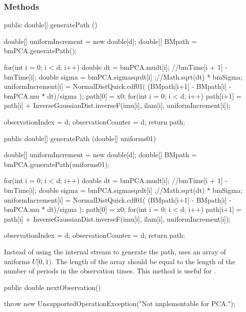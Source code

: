 \subsubsection* {Methods}
\begin{code}\begin{hide}

   public double[] generatePath () {
        double[] uniformIncrement = new double[d];
        double[] BMpath = bmPCA.generatePath();

        for(int i = 0; i < d; i++)
        {
            double dt    = bmPCA.mudt[i]; //bmTime[i + 1] - bmTime[i];
            double sigma = bmPCA.sigmasqrdt[i] ;//Math.sqrt(dt) * bmSigma;
            uniformIncrement[i] =
            NormalDistQuick.cdf01( (BMpath[i+1] - BMpath[i] - bmPCA.mu * dt)/sigma );
        }
        path[0] = x0;
        for(int i = 0; i < d; i++)
            path[i+1] = path[i] +
                InverseGaussianDist.inverseF(imu[i], ilam[i], uniformIncrement[i]);

        observationIndex   = d;
        observationCounter = d;
        return path;
    }\end{hide}

   public double[] generatePath (double[] uniforms01) \begin{hide} {
        double[] uniformIncrement = new double[d];
        double[] BMpath = bmPCA.generatePath(uniforms01);

        for(int i = 0; i < d; i++)
        {
            double dt    = bmPCA.mudt[i]; //bmTime[i + 1] - bmTime[i];
            double sigma = bmPCA.sigmasqrdt[i] ;//Math.sqrt(dt) * bmSigma;
            uniformIncrement[i] =
            NormalDistQuick.cdf01( (BMpath[i+1] - BMpath[i] - bmPCA.mu * dt)/sigma );
        }
        path[0] = x0;
        for(int i = 0; i < d; i++)
            path[i+1] = path[i] +
                InverseGaussianDist.inverseF(imu[i], ilam[i], uniformIncrement[i]);

        observationIndex   = d;
        observationCounter = d;
        return path;
    }\end{hide}
\end{code}
\begin{tabb} Instead of using the internal stream to generate the path,
uses an array of uniforms $U[0,1)$.  The length of the array should be
equal to the length of the number of periods in the observation
times. This method is useful for .
\end{tabb}
\begin{code}

   public double nextObservation() \begin{hide} {
        throw new UnsupportedOperationException("Not implementable for PCA.");
    }\end{hide}
\end{code}
